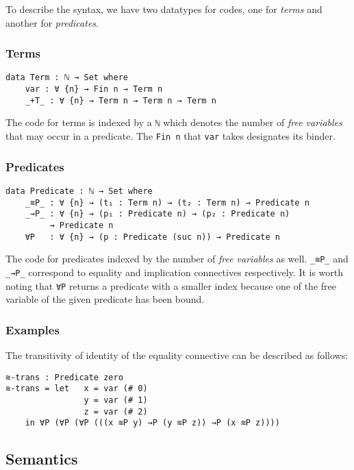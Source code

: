\documentclass[\main/thesis.tex]{subfiles}
\begin{document}
To describe the syntax, we have two datatypes for codes,
one for \textit{terms} and another for \textit{predicates}.

\subsubsection{Terms}

\begin{lstlisting}
data Term : ℕ → Set where
    var : ∀ {n} → Fin n → Term n
    _+T_ : ∀ {n} → Term n → Term n → Term n
\end{lstlisting}

The code for terms is indexed by a \lstinline|ℕ| which denotes the number
of \textit{free variables} that may occur in a predicate.
The \lstinline|Fin n| that \lstinline|var| takes designates its binder.
\subsubsection{Predicates}

\begin{lstlisting}
data Predicate : ℕ → Set where
    _≋P_ : ∀ {n} → (t₁ : Term n) → (t₂ : Term n) → Predicate n
    _→P_ : ∀ {n} → (p₁ : Predicate n) → (p₂ : Predicate n)
         → Predicate n
    ∀P   : ∀ {n} → (p : Predicate (suc n)) → Predicate n
\end{lstlisting}

The code for predicates indexed by the number of \textit{free variables} as well.
\lstinline|_≋P_| and \lstinline|_→P_| correspond to equality and implication
connectives respectively.
It is worth noting that \lstinline|∀P| returns a predicate with a smaller index
because one of the free variable of the given predicate has been bound.

\subsubsection{Examples}

The transitivity of identity of the equality connective can be described
as follows:

\begin{lstlisting}
≋-trans : Predicate zero
≋-trans = let   x = var (# 0)
                y = var (# 1)
                z = var (# 2)
    in ∀P (∀P (∀P (((x ≋P y) →P (y ≋P z)) →P (x ≋P z))))
\end{lstlisting}

\subsection{Semantics}
\end{document}
